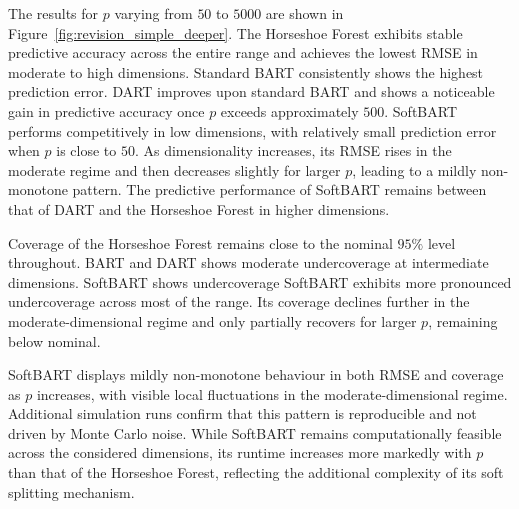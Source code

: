 The results for $p$ varying from $50$ to $5000$ are shown in Figure~\ref{fig:revision_simple_deeper}. 
The Horseshoe Forest exhibits stable predictive accuracy across the entire range and achieves the lowest RMSE in moderate to high dimensions. 
Standard BART consistently shows the highest prediction error. 
DART improves upon standard BART and shows a noticeable gain in predictive accuracy once $p$ exceeds approximately $500$. 
SoftBART performs competitively in low dimensions, with relatively small prediction error when $p$ is close to $50$. 
As dimensionality increases, its RMSE rises in the moderate regime and then decreases slightly for larger $p$, leading to a mildly non-monotone pattern. 
The predictive performance of SoftBART remains between that of DART and the Horseshoe Forest in higher dimensions.

Coverage of the Horseshoe Forest remains close to the nominal $95\%$ level throughout. 
BART and DART shows moderate undercoverage at intermediate dimensions. 
SoftBART shows undercoverage 
SoftBART exhibits more pronounced undercoverage across most of the range. 
Its coverage declines further in the moderate-dimensional regime and only partially recovers for larger $p$, remaining below nominal. 

SoftBART displays mildly non-monotone behaviour in both RMSE and coverage as $p$ increases, with visible local fluctuations in the moderate-dimensional regime. 
Additional simulation runs confirm that this pattern is reproducible and not driven by Monte Carlo noise. 
While SoftBART remains computationally feasible across the considered dimensions, its runtime increases more markedly with $p$ than that of the Horseshoe Forest, reflecting the additional complexity of its soft splitting mechanism.

